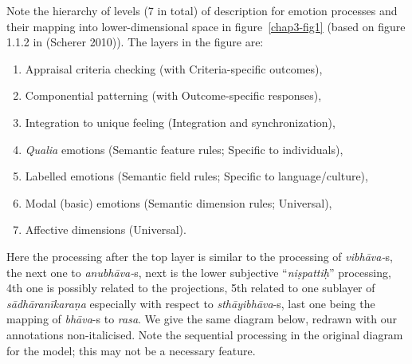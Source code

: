 Note the hierarchy of levels (7 in total) of description for emotion processes and their mapping into lower-dimensional space in figure~\ref{chap3-fig1} (based on figure 1.1.2 in (Scherer 2010)). The layers in the figure are: 
\begin{enumerate}
\itemsep=0pt
\item Appraisal criteria checking (with Criteria-specific outcomes), 

\item Componential patterning (with Outcome-specific responses), 

\item Integration to unique feeling (Integration and synchronization), 

\item \textsl{Qualia} emotions (Semantic feature rules; Specific to individuals), 

\item Labelled emotions (Semantic field rules; Specific to language/\break culture), 

\item Modal (basic) emotions (Semantic dimension rules; Universal), 

\item Affective dimensions (Universal). 
\end{enumerate}
Here the processing after the top layer is similar to the processing of \textsl{vibhāva-}s, the next one to \textsl{anubhāva-}s, next is the lower subjective “\textsl{niṣpattiḥ}” processing, 4th one is possibly related to the projections, 5th related to one sublayer of \textsl{sādhāranīkaraṇa} especially with respect to \textsl{sthāyibhāva}-s, last one being the mapping of \textsl{bhāva}-s to \textsl{rasa}. We give the same diagram below, redrawn with our annotations non-italicised. Note the sequential processing in the original diagram for the model; this may not be a necessary feature. 
